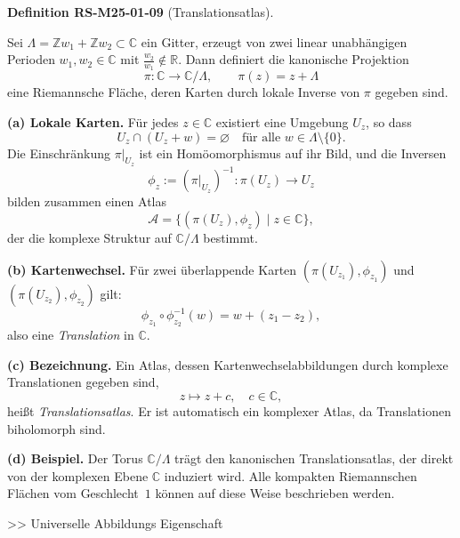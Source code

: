 \documentclass[10pt, letterpaper]{article}
\newcommand{\CustomHeading}[3]{%
  \par\medskip\noindent%
  \textbf{#1 #2} \textnormal{(#3)}.\enskip%
}
\newenvironment{DEF}[2]{\begin{unitbox}\CustomHeading{Definition}{#1}{#2}}{\end{unitbox}}
\begin{document}
\begin{DEF}{RS-M25-01-09}{Translationsatlas}
Sei $\Lambda = \mathbb{Z} w_{1} + \mathbb{Z} w_{2} \subset \mathbb{C}$ ein Gitter, erzeugt von zwei linear unabhängigen Perioden $w_{1}, w_{2} \in \mathbb{C}$ mit $\frac{w_{2}}{w_{1}} \notin \mathbb{R}$.  
Dann definiert die kanonische Projektion
\[
\pi : \mathbb{C} \longrightarrow \mathbb{C}/\Lambda, \qquad \pi(z) = z + \Lambda
\]
eine Riemannsche Fläche, deren Karten durch lokale Inverse von $\pi$ gegeben sind.

\textbf{(a) Lokale Karten.}  
Für jedes $z \in \mathbb{C}$ existiert eine Umgebung $U_{z}$, so dass
\[
U_{z} \cap (U_{z} + w) = \varnothing \quad \text{für alle } w \in \Lambda \setminus \{0\}.
\]
Die Einschränkung $\pi|_{U_{z}}$ ist ein Homöomorphismus auf ihr Bild, und die Inversen
\[
\phi_{z} := \left(\pi|_{U_{z}}\right)^{-1} : \pi(U_{z}) \longrightarrow U_{z}
\]
bilden zusammen einen Atlas
\[
\mathcal{A} = \{ (\pi(U_{z}), \phi_{z}) \mid z \in \mathbb{C} \},
\]
der die komplexe Struktur auf $\mathbb{C}/\Lambda$ bestimmt.

\textbf{(b) Kartenwechsel.}  
Für zwei überlappende Karten $(\pi(U_{z_{1}}), \phi_{z_{1}})$ und $(\pi(U_{z_{2}}), \phi_{z_{2}})$ gilt:
\[
\phi_{z_{1}} \circ \phi_{z_{2}}^{-1}(w) = w + (z_{1} - z_{2}),
\]
also eine \emph{Translation} in $\mathbb{C}$.

\textbf{(c) Bezeichnung.}  
Ein Atlas, dessen Kartenwechselabbildungen durch komplexe Translationen gegeben sind,
\[
z \longmapsto z + c, \quad c \in \mathbb{C},
\]
heißt \emph{Translationsatlas}.  
Er ist automatisch ein komplexer Atlas, da Translationen biholomorph sind.

\textbf{(d) Beispiel.}  
Der Torus $\mathbb{C}/\Lambda$ trägt den kanonischen Translationsatlas, der direkt von der komplexen Ebene $\mathbb{C}$ induziert wird.  
Alle kompakten Riemannschen Flächen vom Geschlecht~$1$ können auf diese Weise beschrieben werden.
\end{DEF}



>> Universelle Abbildungs Eigenschaft
\end{document}
